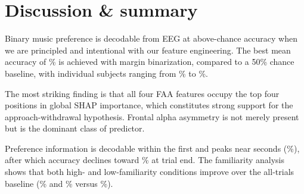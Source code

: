 \documentclass[12pt,letterpaper]{article}
\begin{document}
\section{Discussion \& summary}

Binary music preference is decodable from EEG at above-chance accuracy when we are
principled and intentional with our feature engineering. The best mean accuracy of \MargMean\% is achieved with margin
binarization, compared to a 50\% chance baseline, with individual subjects ranging from
\MargMin\% to \MargMax\%.

The most striking finding is that all four FAA features occupy the top four positions in
global SHAP importance, which constitutes strong support for the approach-withdrawal hypothesis.
Frontal alpha asymmetry is not merely present but is the dominant class of predictor.

Preference information is decodable within the first \TemporalFirstTime{} and peaks near
\TemporalPeakTime{} seconds (\TemporalPeakAcc\%), after which accuracy declines toward
\TemporalFinalAcc\% at trial end. The familiarity analysis shows that both high- and
low-familiarity conditions improve over the all-trials baseline (\FamHighAcc\% and
\FamLowAcc\% versus \FamAllAcc\%).

\makereference


\end{document}
